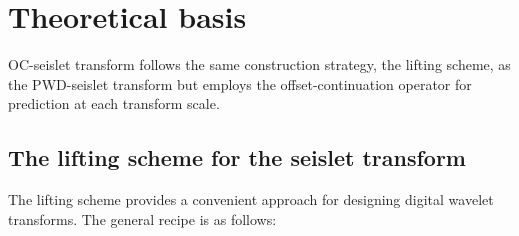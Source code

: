 \section{Theoretical basis}

OC-seislet transform follows the same construction strategy, the
lifting scheme, as the PWD-seislet transform but employs the
offset-continuation operator for prediction at each transform scale.

\subsection {The lifting scheme for the seislet transform}

The lifting scheme \cite[]{Sweldens95} provides a convenient approach
for designing digital wavelet transforms. The general recipe is as
follows:
